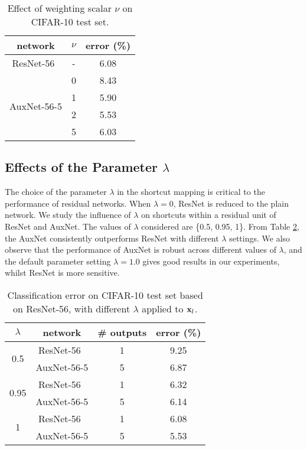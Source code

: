 \documentclass[10pt,onecolumn,letterpaper]{article}
\def\bx{{\bf x}}
\def\SexyName{AuxNet\xspace}
\begin{document}
\begin{table}[h]
  \centering
  \caption{Effect of weighting scalar $\nu$ on CIFAR-10 test set.}
    \begin{tabular}{c|c|c}
    \hline
    network & $\nu$ & error (\%) \\
    \hline
    ResNet-56~\cite{he2016identity} & - & 6.08 \\
    \hline
    \multirow{4}{*}{\SexyName-56-5} & 0 & 8.43 \\
    & 1 & 5.90 \\
    & 2 & 5.53 \\
    & 5 & 6.03 \\
    \hline
    \end{tabular}%
  \label{tab:weight}%
\end{table}

\subsection{Effects of the Parameter $\lambda$}\label{exp:lambda}
The choice of the parameter $\lambda$ in the shortcut mapping
is critical to the performance of residual networks. When $\lambda = 0$, ResNet is reduced to the plain network. We study the influence of $\lambda$ on shortcuts within a residual unit of ResNet and \SexyName. The values of $\lambda$ considered are \{0.5, 0.95, 1\}.  From Table \ref{tab:lambda}, the \SexyName consistently outperforms ResNet with different $\lambda$ settings. We also observe that the performance of \SexyName is robust across different values of $\lambda$, and the default parameter setting $\lambda=1.0$ gives good results in our experiments, whilst ResNet is more sensitive.

\begin{table}[h]
  \centering
  \caption{Classification error on CIFAR-10 test set based on ResNet-56, with different $\lambda$ applied to $\bx_l$.}
    \begin{tabular}{c|c|c|c}
    \hline
    $\lambda$ & network & \# outputs & error (\%) \\
    \hline
    \multirow{2}[3]{*}{0.5} & ResNet-56~\cite{he2016identity} & 1   & 9.25 \\
          & \SexyName-56-5 & 5  & 6.87 \\
    \hline
    \multirow{2}[3]{*}{0.95} & ResNet-56~\cite{he2016identity} & 1   & 6.32 \\
          & \SexyName-56-5 & 5   & 6.14 \\
    \hline
    \multirow{2}[3]{*}{1} & ResNet-56~\cite{he2016identity} & 1    & 6.08 \\
          & \SexyName-56-5 & 5  & 5.53 \\
    \hline
    \end{tabular}%
  \label{tab:lambda}%
\end{table}
\end{document}
